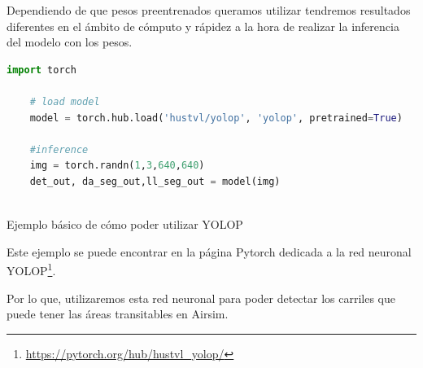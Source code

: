 Dependiendo de que pesos preentrenados queramos utilizar tendremos resultados diferentes en el ámbito de cómputo y rápidez a la hora de 
realizar la inferencia del modelo con los pesos. \newline

\begin{code}[h]
  \begin{lstlisting}[language=Python]
    import torch

    # load model
    model = torch.hub.load('hustvl/yolop', 'yolop', pretrained=True)
    
    #inference
    img = torch.randn(1,3,640,640)
    det_out, da_seg_out,ll_seg_out = model(img)
    
  \end{lstlisting}
  \caption[Cargar modelo YOLOP con pesos preentrenados End-to-end.pth]{Ejemplo básico de cómo poder utilizar YOLOP}
  \label{cod:codejemplo}
  \end{code}  
Este ejemplo se puede encontrar en la página Pytorch dedicada a la red neuronal YOLOP\footnote{\url{https://pytorch.org/hub/hustvl_yolop/}}.

Por lo que, utilizaremos esta red neuronal para poder detectar los carriles que puede tener las áreas transitables en Airsim.

